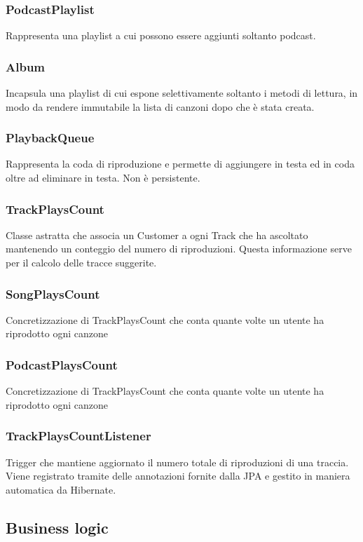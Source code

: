 \documentclass{article}
\begin{document}
  \subsubsection{PodcastPlaylist}
  Rappresenta una playlist a cui possono essere aggiunti soltanto podcast.
  \subsubsection{Album}
  Incapsula una playlist di cui espone selettivamente soltanto i metodi di lettura, in modo da rendere immutabile la lista di canzoni dopo che è stata creata.
  \subsubsection{PlaybackQueue}
  Rappresenta la coda di riproduzione e permette di aggiungere in testa ed in coda oltre ad eliminare in testa. Non è persistente.

  \subsubsection{TrackPlaysCount}
  Classe astratta che associa un Customer a ogni Track che ha ascoltato mantenendo un conteggio del numero di riproduzioni. Questa informazione serve per il calcolo delle tracce suggerite.

  \subsubsection{SongPlaysCount}
  Concretizzazione di TrackPlaysCount che conta quante volte un utente ha riprodotto ogni canzone

  \subsubsection{PodcastPlaysCount}
  Concretizzazione di TrackPlaysCount che conta quante volte un utente ha riprodotto ogni canzone

  \subsubsection{TrackPlaysCountListener}
  Trigger che mantiene aggiornato il numero totale di riproduzioni di una traccia. Viene registrato tramite delle annotazioni fornite dalla JPA e gestito in maniera automatica da Hibernate.

  \subsection{Business logic}
\end{document}
